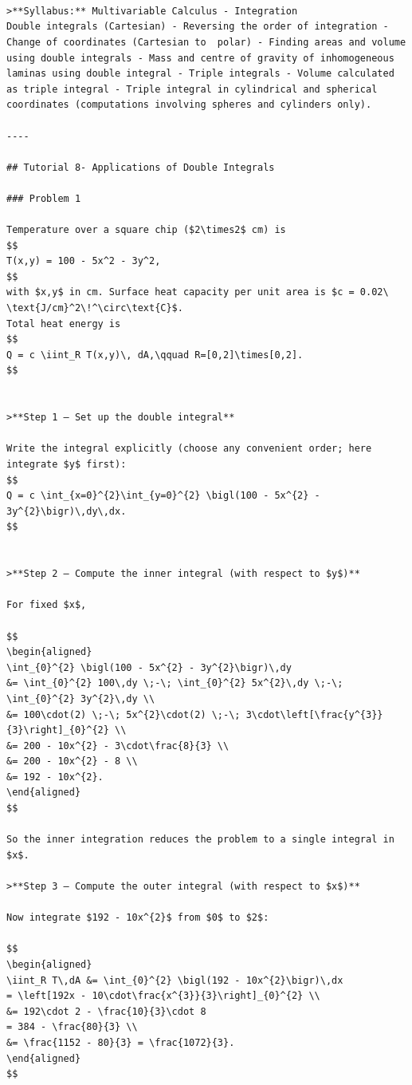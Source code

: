 \documentclass[
  letterpaper,
  DIV=11,
  numbers=noendperiod]{scrreprt}
\begin{document}
\begin{verbatim}



>**Syllabus:** Multivariable Calculus - Integration
Double integrals (Cartesian) - Reversing the order of integration - Change of coordinates (Cartesian to  polar) - Finding areas and volume using double integrals - Mass and centre of gravity of inhomogeneous laminas using double integral - Triple integrals - Volume calculated as triple integral - Triple integral in cylindrical and spherical coordinates (computations involving spheres and cylinders only).

----

## Tutorial 8- Applications of Double Integrals

### Problem 1 

Temperature over a square chip ($2\times2$ cm) is
$$
T(x,y) = 100 - 5x^2 - 3y^2,
$$
with $x,y$ in cm. Surface heat capacity per unit area is $c = 0.02\ \text{J/cm}^2\!^\circ\text{C}$.  
Total heat energy is
$$
Q = c \iint_R T(x,y)\, dA,\qquad R=[0,2]\times[0,2].
$$


>**Step 1 — Set up the double integral**

Write the integral explicitly (choose any convenient order; here integrate $y$ first):
$$
Q = c \int_{x=0}^{2}\int_{y=0}^{2} \bigl(100 - 5x^{2} - 3y^{2}\bigr)\,dy\,dx.
$$


>**Step 2 — Compute the inner integral (with respect to $y$)**

For fixed $x$,

$$
\begin{aligned}
\int_{0}^{2} \bigl(100 - 5x^{2} - 3y^{2}\bigr)\,dy
&= \int_{0}^{2} 100\,dy \;-\; \int_{0}^{2} 5x^{2}\,dy \;-\; \int_{0}^{2} 3y^{2}\,dy \\
&= 100\cdot(2) \;-\; 5x^{2}\cdot(2) \;-\; 3\cdot\left[\frac{y^{3}}{3}\right]_{0}^{2} \\
&= 200 - 10x^{2} - 3\cdot\frac{8}{3} \\
&= 200 - 10x^{2} - 8 \\
&= 192 - 10x^{2}.
\end{aligned}
$$

So the inner integration reduces the problem to a single integral in $x$.

>**Step 3 — Compute the outer integral (with respect to $x$)**

Now integrate $192 - 10x^{2}$ from $0$ to $2$:

$$
\begin{aligned}
\iint_R T\,dA &= \int_{0}^{2} \bigl(192 - 10x^{2}\bigr)\,dx
= \left[192x - 10\cdot\frac{x^{3}}{3}\right]_{0}^{2} \\
&= 192\cdot 2 - \frac{10}{3}\cdot 8
= 384 - \frac{80}{3} \\
&= \frac{1152 - 80}{3} = \frac{1072}{3}.
\end{aligned}
$$


\end{verbatim}
\end{document}
